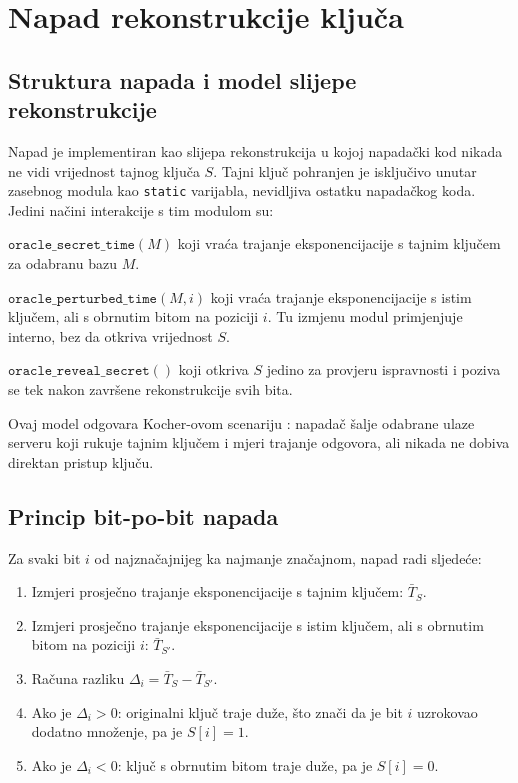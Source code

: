 \section{Napad rekonstrukcije ključa}
\label{sec:key_recon}

\subsection{Struktura napada i model slijepe rekonstrukcije}

Napad je implementiran kao slijepa rekonstrukcija u kojoj napadački kod nikada ne vidi vrijednost tajnog ključa $S$. Tajni ključ pohranjen je isključivo unutar zasebnog modula kao \texttt{static} varijabla, nevidljiva ostatku napadačkog koda. Jedini načini interakcije s tim modulom su:

$\texttt{oracle\_secret\_time}(M)$ koji vraća trajanje eksponencijacije s tajnim ključem za odabranu bazu $M$.

$\texttt{oracle\_perturbed\_time}(M, i)$ koji vraća trajanje eksponencijacije s istim ključem, ali s obrnutim bitom na poziciji $i$. Tu izmjenu modul primjenjuje interno, bez da otkriva vrijednost $S$.

$\texttt{oracle\_reveal\_secret}()$ koji otkriva $S$ jedino za provjeru ispravnosti i poziva se tek nakon završene rekonstrukcije svih bita.

Ovaj model odgovara Kocher-ovom scenariju \cite{kocher1996}: napadač šalje odabrane ulaze serveru koji rukuje tajnim ključem i mjeri trajanje odgovora, ali nikada ne dobiva direktan pristup ključu.

\subsection{Princip bit-po-bit napada}

Za svaki bit $i$ od najznačajnijeg ka najmanje značajnom, napad radi sljedeće:

\begin{enumerate}
\item Izmjeri prosječno trajanje eksponencijacije s tajnim ključem: $\bar{T}_S$.
\item Izmjeri prosječno trajanje eksponencijacije s istim ključem, ali s obrnutim bitom na poziciji $i$: $\bar{T}_{S'}$.
\item Računa razliku $\Delta_i = \bar{T}_S - \bar{T}_{S'}$.
\item Ako je $\Delta_i > 0$: originalni ključ traje duže, što znači da je bit $i$ uzrokovao dodatno množenje, pa je $S[i] = 1$.
\item Ako je $\Delta_i < 0$: ključ s obrnutim bitom traje duže, pa je $S[i] = 0$.
\end{enumerate}

